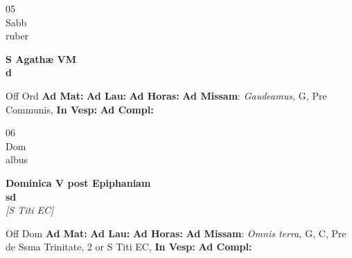 \documentclass[10pt, openany]{book}
\begin{document}
        \begin{center}
            \begin{minipage}{3.5in}
                \vspace{2em}
                \begin{minipage}{0.5in}
                    {\Huge 05} \\
                    {\normalsize Sabb} \\
                    {\normalsize ruber}
                \end{minipage}
                \begin{minipage}{3.0in}
                    \textbf{ \large S Agathæ VM \\
                    \textnormal{\normalsize d}} \\ 
                \end{minipage}
                \begin{justify}Off Ord
                    \textbf{Ad Mat: }
                    \textbf{Ad Lau: }
                    \textbf{Ad Horas: }\textbf{Ad Missam}: \textit{Gaudeamus,} G, Pre Communis,  
                    \textbf{In Vesp: }
                    \textbf{Ad Compl: }
                \end{justify}
            \end{minipage}
        \end{center}
    
        \begin{center}
            \begin{minipage}{3.5in}
                \vspace{2em}
                \begin{minipage}{0.5in}
                    {\Huge 06} \\
                    {\normalsize Dom} \\
                    {\normalsize albus}
                \end{minipage}
                \begin{minipage}{3.0in}
                    \textbf{ \large Dominica V post Epiphaniam \\
                    \textnormal{\normalsize sd}} \\ \textit{[S Titi EC]} \\ 
                \end{minipage}
                \begin{justify}Off Dom
                    \textbf{Ad Mat: }
                    \textbf{Ad Lau: }
                    \textbf{Ad Horas: }\textbf{Ad Missam}: \textit{Omnis terra,} G, C, Pre de Ssma Trinitate, 2 or S Titi EC,  
                    \textbf{In Vesp: }
                    \textbf{Ad Compl: }
                \end{justify}
            \end{minipage}
        \end{center}
    
\end{document}
